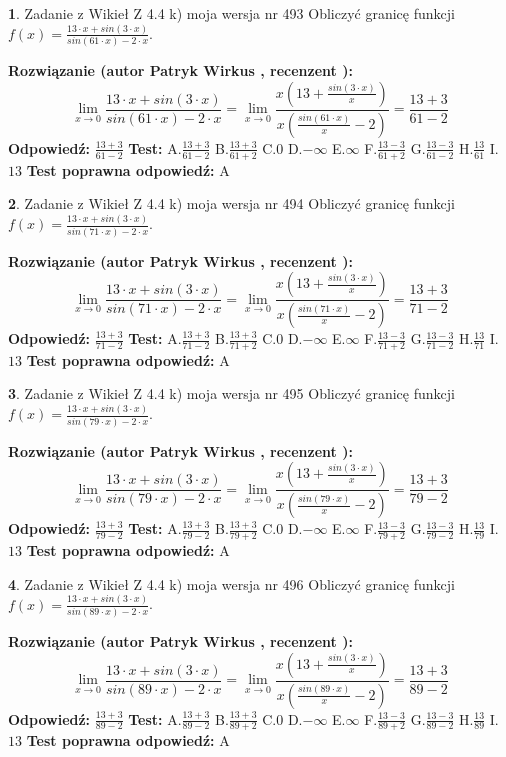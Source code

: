 \documentclass[12pt, a4paper]{article}
\theoremstyle{definition} %
\newtheorem{zad}{}
\newcommand{\zadStart}[1]{\begin{zad}#1\newline}
\newcommand{\zadStop}{\end{zad}}
\newcommand{\rozwStart}[2]{\noindent \textbf{Rozwiązanie (autor #1 , recenzent #2): }\newline}
\newcommand{\rozwStop}{\newline}
\newcommand{\odpStart}{\noindent \textbf{Odpowiedź:}\newline}
\newcommand{\odpStop}{\newline}
\newcommand{\testStart}{\noindent \textbf{Test:}\newline}
\newcommand{\testStop}{\newline}
\newcommand{\kluczStart}{\noindent \textbf{Test poprawna odpowiedź:}\newline}
\newcommand{\kluczStop}{\newline}
\begin{document}
\zadStart{Zadanie z Wikieł Z 4.4 k) moja wersja nr 493}
Obliczyć granicę funkcji $f(x)=\frac{13\cdot x +sin(3\cdot x)}{sin(61\cdot x) -2\cdot x}$.
\zadStop
\rozwStart{Patryk Wirkus}{}
$$\lim\limits_{x\to 0}\frac{13\cdot x +sin(3\cdot x)}{sin(61\cdot x) -2\cdot x}
=\lim\limits_{x\to 0}\frac{x(13+\frac{sin(3\cdot x)}{x})}{x(\frac{sin(61\cdot x)}{x}-2)}
=\frac{13+3}{61-2}$$
\rozwStop
\odpStart
$\frac{13+3}{61-2}$
\odpStop
\testStart
A.$\frac{13+3}{61-2}$
B.$\frac{13+3}{61+2}$
C.$0$
D.$-\infty$
E.$\infty$
F.$\frac{13-3}{61+2}$
G.$\frac{13-3}{61-2}$
H.$\frac{13}{61}$
I.$13$
\testStop
\kluczStart
A
\kluczStop



\zadStart{Zadanie z Wikieł Z 4.4 k) moja wersja nr 494}
Obliczyć granicę funkcji $f(x)=\frac{13\cdot x +sin(3\cdot x)}{sin(71\cdot x) -2\cdot x}$.
\zadStop
\rozwStart{Patryk Wirkus}{}
$$\lim\limits_{x\to 0}\frac{13\cdot x +sin(3\cdot x)}{sin(71\cdot x) -2\cdot x}
=\lim\limits_{x\to 0}\frac{x(13+\frac{sin(3\cdot x)}{x})}{x(\frac{sin(71\cdot x)}{x}-2)}
=\frac{13+3}{71-2}$$
\rozwStop
\odpStart
$\frac{13+3}{71-2}$
\odpStop
\testStart
A.$\frac{13+3}{71-2}$
B.$\frac{13+3}{71+2}$
C.$0$
D.$-\infty$
E.$\infty$
F.$\frac{13-3}{71+2}$
G.$\frac{13-3}{71-2}$
H.$\frac{13}{71}$
I.$13$
\testStop
\kluczStart
A
\kluczStop



\zadStart{Zadanie z Wikieł Z 4.4 k) moja wersja nr 495}
Obliczyć granicę funkcji $f(x)=\frac{13\cdot x +sin(3\cdot x)}{sin(79\cdot x) -2\cdot x}$.
\zadStop
\rozwStart{Patryk Wirkus}{}
$$\lim\limits_{x\to 0}\frac{13\cdot x +sin(3\cdot x)}{sin(79\cdot x) -2\cdot x}
=\lim\limits_{x\to 0}\frac{x(13+\frac{sin(3\cdot x)}{x})}{x(\frac{sin(79\cdot x)}{x}-2)}
=\frac{13+3}{79-2}$$
\rozwStop
\odpStart
$\frac{13+3}{79-2}$
\odpStop
\testStart
A.$\frac{13+3}{79-2}$
B.$\frac{13+3}{79+2}$
C.$0$
D.$-\infty$
E.$\infty$
F.$\frac{13-3}{79+2}$
G.$\frac{13-3}{79-2}$
H.$\frac{13}{79}$
I.$13$
\testStop
\kluczStart
A
\kluczStop



\zadStart{Zadanie z Wikieł Z 4.4 k) moja wersja nr 496}
Obliczyć granicę funkcji $f(x)=\frac{13\cdot x +sin(3\cdot x)}{sin(89\cdot x) -2\cdot x}$.
\zadStop
\rozwStart{Patryk Wirkus}{}
$$\lim\limits_{x\to 0}\frac{13\cdot x +sin(3\cdot x)}{sin(89\cdot x) -2\cdot x}
=\lim\limits_{x\to 0}\frac{x(13+\frac{sin(3\cdot x)}{x})}{x(\frac{sin(89\cdot x)}{x}-2)}
=\frac{13+3}{89-2}$$
\rozwStop
\odpStart
$\frac{13+3}{89-2}$
\odpStop
\testStart
A.$\frac{13+3}{89-2}$
B.$\frac{13+3}{89+2}$
C.$0$
D.$-\infty$
E.$\infty$
F.$\frac{13-3}{89+2}$
G.$\frac{13-3}{89-2}$
H.$\frac{13}{89}$
I.$13$
\testStop
\kluczStart
A
\kluczStop
\end{document}

